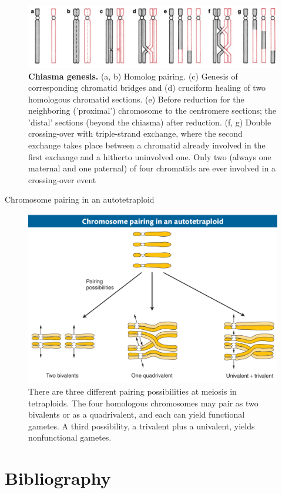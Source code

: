 \documentclass[11pt,ignorenonframetext,aspectratio=169]{beamer}
\begin{document}
\begin{frame}{}
\protect\hypertarget{section-11}{}
\begin{figure}
\includegraphics[width=0.65\linewidth]{../images/chiasma_genesis} \caption{\textbf{Chiasma genesis.} (a, b) Homolog pairing. (c) Genesis of corresponding chromatid bridges and (d) cruciform healing of two homologous chromatid sections. (e) Before reduction for the neighboring ('proximal') chromosome to the centromere sections; the 'distal' sections (beyond the chiasma) after reduction. (f, g) Double crossing-over with triple-strand exchange, where the second exchange takes place between a chromatid already involved in the first exchange and a hitherto uninvolved one. Only two (always one maternal and one paternal) of four chromatids are ever involved in a crossing-over event}\label{fig:chiasmata-structure}
\end{figure}
\end{frame}

\begin{frame}{Chromosome pairing in an autotetraploid}
\protect\hypertarget{chromosome-pairing-in-an-autotetraploid}{}
\begin{figure}
\includegraphics[width=0.65\linewidth]{../images/autotetraploid_chromosome_pairing} \caption{There are three different pairing possibilities at meiosis in tetraploids. The four homologous chromosomes may pair as two bivalents or as a quadrivalent, and each can yield functional gametes. A third possibility, a trivalent plus a univalent, yields nonfunctional gametes.}\label{fig:autotetraploid-chromosome-pairing}
\end{figure}
\end{frame}

\hypertarget{bibliography}{%
\section{Bibliography}\label{bibliography}}

\begin{frame}{}
\protect\hypertarget{section-12}{}
\end{frame}
\end{document}
